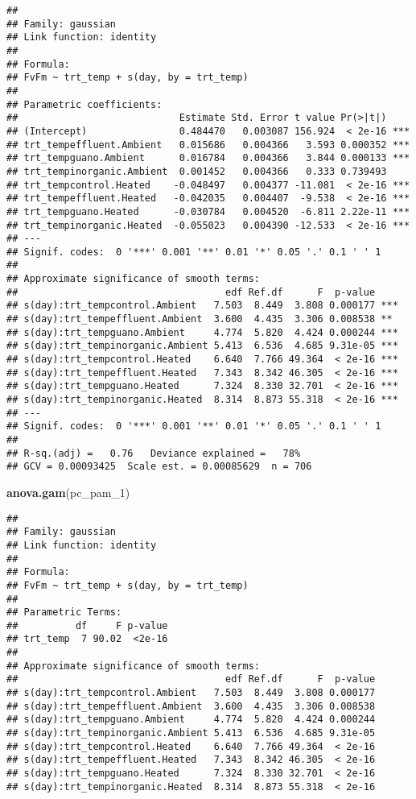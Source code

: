 \documentclass[
]{article}
\newenvironment{Shaded}{\begin{snugshade}}{\end{snugshade}}
\newcommand{\FunctionTok}[1]{\textcolor[rgb]{0.13,0.29,0.53}{\textbf{#1}}}
\newcommand{\NormalTok}[1]{#1}
\begin{document}
\begin{verbatim}
## 
## Family: gaussian 
## Link function: identity 
## 
## Formula:
## FvFm ~ trt_temp + s(day, by = trt_temp)
## 
## Parametric coefficients:
##                            Estimate Std. Error t value Pr(>|t|)    
## (Intercept)                0.484470   0.003087 156.924  < 2e-16 ***
## trt_tempeffluent.Ambient   0.015686   0.004366   3.593 0.000352 ***
## trt_tempguano.Ambient      0.016784   0.004366   3.844 0.000133 ***
## trt_tempinorganic.Ambient  0.001452   0.004366   0.333 0.739493    
## trt_tempcontrol.Heated    -0.048497   0.004377 -11.081  < 2e-16 ***
## trt_tempeffluent.Heated   -0.042035   0.004407  -9.538  < 2e-16 ***
## trt_tempguano.Heated      -0.030784   0.004520  -6.811 2.22e-11 ***
## trt_tempinorganic.Heated  -0.055023   0.004390 -12.533  < 2e-16 ***
## ---
## Signif. codes:  0 '***' 0.001 '**' 0.01 '*' 0.05 '.' 0.1 ' ' 1
## 
## Approximate significance of smooth terms:
##                                    edf Ref.df      F  p-value    
## s(day):trt_tempcontrol.Ambient   7.503  8.449  3.808 0.000177 ***
## s(day):trt_tempeffluent.Ambient  3.600  4.435  3.306 0.008538 ** 
## s(day):trt_tempguano.Ambient     4.774  5.820  4.424 0.000244 ***
## s(day):trt_tempinorganic.Ambient 5.413  6.536  4.685 9.31e-05 ***
## s(day):trt_tempcontrol.Heated    6.640  7.766 49.364  < 2e-16 ***
## s(day):trt_tempeffluent.Heated   7.343  8.342 46.305  < 2e-16 ***
## s(day):trt_tempguano.Heated      7.324  8.330 32.701  < 2e-16 ***
## s(day):trt_tempinorganic.Heated  8.314  8.873 55.318  < 2e-16 ***
## ---
## Signif. codes:  0 '***' 0.001 '**' 0.01 '*' 0.05 '.' 0.1 ' ' 1
## 
## R-sq.(adj) =   0.76   Deviance explained =   78%
## GCV = 0.00093425  Scale est. = 0.00085629  n = 706
\end{verbatim}

\begin{Shaded}
\begin{Highlighting}[]
\FunctionTok{anova.gam}\NormalTok{(pc\_pam\_1)}
\end{Highlighting}
\end{Shaded}

\begin{verbatim}
## 
## Family: gaussian 
## Link function: identity 
## 
## Formula:
## FvFm ~ trt_temp + s(day, by = trt_temp)
## 
## Parametric Terms:
##          df     F p-value
## trt_temp  7 90.02  <2e-16
## 
## Approximate significance of smooth terms:
##                                    edf Ref.df      F  p-value
## s(day):trt_tempcontrol.Ambient   7.503  8.449  3.808 0.000177
## s(day):trt_tempeffluent.Ambient  3.600  4.435  3.306 0.008538
## s(day):trt_tempguano.Ambient     4.774  5.820  4.424 0.000244
## s(day):trt_tempinorganic.Ambient 5.413  6.536  4.685 9.31e-05
## s(day):trt_tempcontrol.Heated    6.640  7.766 49.364  < 2e-16
## s(day):trt_tempeffluent.Heated   7.343  8.342 46.305  < 2e-16
## s(day):trt_tempguano.Heated      7.324  8.330 32.701  < 2e-16
## s(day):trt_tempinorganic.Heated  8.314  8.873 55.318  < 2e-16
\end{verbatim}
\end{document}

